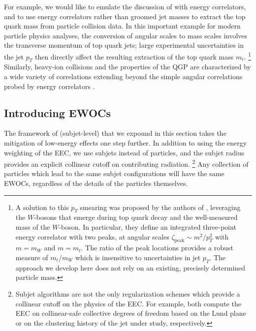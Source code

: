 For example, we would like to emulate the discussion of  with energy correlators, and to use energy correlators rather than groomed jet masses to extract the top quark mass from particle collision data.
%
In this important example for modern particle physics analyses, the conversion of angular scales to mass scales involves the transverse momentum of top quark jets;
%
large experimental uncertainties in the jet \(p_T\) then directly affect the resulting extraction of the top quark mass \(m_t\).%
\footnote{
    A solution to this \(p_T\) smearing was proposed by the authors of , leveraging the \(W\)-bosons that emerge during top quark decay and the well-measured mass of the \(W\)-boson.
    In particular, they define an integrated three-point energy correlator with two peaks, at angular scales \(\zeta_\text{peak} \sim m^2 / p_T^2\) with $m=m_W$ and $m=m_t$.
    The ratio of the peak locations provides a robust measure of \(m_t/m_W\) which is insensitive to uncertainties in jet \(p_T\).
    The approach we develop here does not rely on an existing, precisely determined particle mass.
}
%
Similarly, heavy-ion collisions and the properties of the QGP are characterized by a wide variety of correlations extending beyond the simple angular correlations probed by energy correlators \cite{Lokhtin:2004tx,Lokhtin:2006dp,Andres:2022ovj,Barata:2023zqg,Andres:2023xwr,Yang:2023dwc,Barata:2023vnl,Barata:2023bhh,Barata:2024nqo}.

\subsection{Introducing EWOCs}
\label{sec:ewoc-intro}



The framework of (subjet-level)  that we expound in this section takes the mitigation of low-energy effects one step further.
%
In addition to using the energy weighting of the EEC, we use subjets instead of particles, and the subjet radius provides an explicit collinear cutoff on contributing radiation.%
\footnote{
    Subjet algorithms are not the only regularization schemes which provide a collinear cutoff on the physics of the EEC.
    For example,  both compute the EEC on collinear-safe collective degrees of freedom based on the Lund plane or on the clustering history of the jet under study, respectively.
}
%
Any collection of particles which lead to the same subjet configurations will have the same EWOCs, regardless of the details of the particles themselves.

